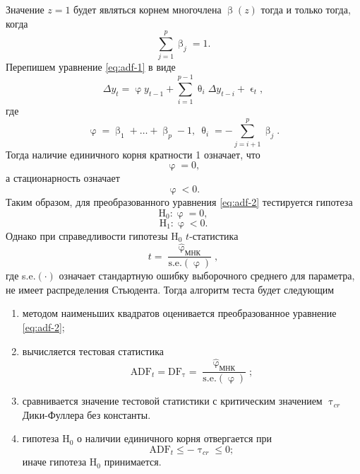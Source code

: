 \documentclass[a4paper, 14pt]{extreport}
\numberwithin{equation}{section}
\renewcommand{\leq}{\leqslant}
\renewcommand{\beta}{\upbeta}
\renewcommand{\epsilon}{\upvarepsilon}
\renewcommand{\theta}{\uptheta}
\renewcommand{\tau}{\uptau}
\renewcommand{\varphi}{\upvarphi}
\numberwithin{equation}{section}
\begin{document}
	Значение $z=1$ будет являться корнем многочлена $\beta(z)$ тогда и только тогда, когда 
	\begin{equation*}
		\sum\limits_{j=1}^p\beta_j=1.
	\end{equation*} 
	Перепишем уравнение \eqref{eq:adf-1} в виде 
	\begin{equation}\label{eq:adf-2}
		\Delta y_t=\varphi y_{t-1}+\sum_{i=1}^{p-1}\theta_i\Delta y_{t-i}+\epsilon_t,
	\end{equation}
	где 
	\begin{equation*}
		\varphi=\beta_1+\dots+\beta_p-1,\ \theta_i=-\sum\limits_{j=i+1}^p\beta_j.
	\end{equation*} 
	Тогда наличие единичного корня кратности 1 означает, что \begin{equation*}
		\varphi=0,
	\end{equation*} 
	а стационарность означает 
	\begin{equation*}
	\varphi< 0.
	\end{equation*}
	Таким образом, для преобразованного уравнения \eqref{eq:adf-2} тестируется гипотеза
	$$\text{H}_0:\varphi=0,$$ $$\text{H}_1:\varphi< 0.$$
	Однако при справедливости гипотезы	 $\text{H}_0$ $t$-статистика
	\begin{equation}
		t=\dfrac{\widehat{\varphi}_{\text{МНК}}}{\text{s.e.}(\varphi)},
	\end{equation}
	где s.e.$(\cdot)$ означает стандартную ошибку выборочного среднего для параметра,
	не имеет распределения Стьюдента. Тогда алгоритм теста будет следующим
	\begin{enumerate}
		\item методом наименьших квадратов оценивается преобразованное уравнение \eqref{eq:adf-2};
		\item вычисляется тестовая статистика
		\begin{equation}
			\text{ADF}_t=\text{DF}_\tau=\dfrac{\widehat{\varphi}_{\text{МНК}}}{\text{s.e.}(\varphi)};
		\end{equation}
		\item сравнивается значение тестовой статистики с критическим значением $\tau_{cr}$ Дики-Фуллера без константы.
		\item гипотеза $\text{H}_0$ о наличии единичного корня отвергается при
		\begin{equation}
			\text{ADF}_t\leq -\tau_{cr}\leq 0;
		\end{equation}
		иначе гипотеза $\text{H}_0$ принимается.
	\end{enumerate}
\end{document}
